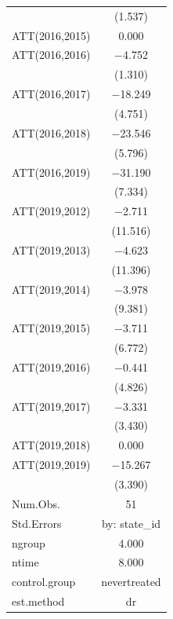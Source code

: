 \documentclass[
]{article}
\begin{document}
\begin{table}
\begin{tabular}[t]{lc}
 & (\num{1.537})\\
ATT(2016,2015) & \num{0.000}\\
ATT(2016,2016) & \num{-4.752}\\
 & (\num{1.310})\\
ATT(2016,2017) & \num{-18.249}\\
 & (\num{4.751})\\
ATT(2016,2018) & \num{-23.546}\\
 & (\num{5.796})\\
ATT(2016,2019) & \num{-31.190}\\
 & (\num{7.334})\\
ATT(2019,2012) & \num{-2.711}\\
 & (\num{11.516})\\
ATT(2019,2013) & \num{-4.623}\\
 & (\num{11.396})\\
ATT(2019,2014) & \num{-3.978}\\
 & (\num{9.381})\\
ATT(2019,2015) & \num{-3.711}\\
 & (\num{6.772})\\
ATT(2019,2016) & \num{-0.441}\\
 & (\num{4.826})\\
ATT(2019,2017) & \num{-3.331}\\
 & (\num{3.430})\\
ATT(2019,2018) & \num{0.000}\\
ATT(2019,2019) & \num{-15.267}\\
 & (\num{3.390})\\
\midrule
Num.Obs. & \num{51}\\
Std.Errors & by: state\_id\\
ngroup & \num{4.000}\\
ntime & \num{8.000}\\
control.group & nevertreated\\
est.method & dr\\
\bottomrule
\end{tabular}
\end{table}
\end{document}
